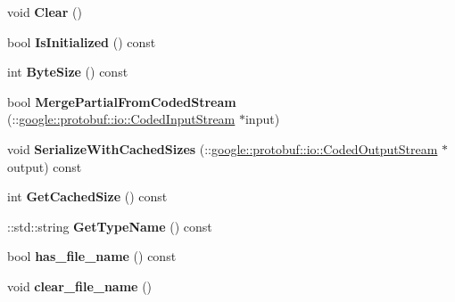 \begin{DoxyCompactItemize}
\item 
\mbox{\label{classruntime_1_1FileSendComplete_aa4c6920d1122a7e35d5acfa27dbf471d}} 
void {\bfseries Clear} ()
\item 
\mbox{\label{classruntime_1_1FileSendComplete_a31dc45bc274d96a0aa7cd21b8eb2ac22}} 
bool {\bfseries Is\+Initialized} () const
\item 
\mbox{\label{classruntime_1_1FileSendComplete_a48c6e880500e0e4cec186c8f3e306ef7}} 
int {\bfseries Byte\+Size} () const
\item 
\mbox{\label{classruntime_1_1FileSendComplete_a55cd989a695b9f8e29b6eeb7172e4264}} 
bool {\bfseries Merge\+Partial\+From\+Coded\+Stream} (\+::\hyperlink{classgoogle_1_1protobuf_1_1io_1_1CodedInputStream}{google\+::protobuf\+::io\+::\+Coded\+Input\+Stream} $\ast$input)
\item 
\mbox{\label{classruntime_1_1FileSendComplete_ae2e1d0c6a3a2a214683bc391da55deea}} 
void {\bfseries Serialize\+With\+Cached\+Sizes} (\+::\hyperlink{classgoogle_1_1protobuf_1_1io_1_1CodedOutputStream}{google\+::protobuf\+::io\+::\+Coded\+Output\+Stream} $\ast$output) const
\item 
\mbox{\label{classruntime_1_1FileSendComplete_ac8e23a8999c8c9cb00cb87edb1726ce3}} 
int {\bfseries Get\+Cached\+Size} () const
\item 
\mbox{\label{classruntime_1_1FileSendComplete_a6e8c9bccfcf32fb32fe8eb21f0008e21}} 
\+::std\+::string {\bfseries Get\+Type\+Name} () const
\item 
\mbox{\label{classruntime_1_1FileSendComplete_a8fbf75f0177471d7144e9e4ce3aabf04}} 
bool {\bfseries has\+\_\+file\+\_\+name} () const
\item 
\mbox{\label{classruntime_1_1FileSendComplete_a3d56f9565c435ea614ff5f6bdb50690c}} 
void {\bfseries clear\+\_\+file\+\_\+name} ()
\item 

\end{DoxyCompactItemize}
